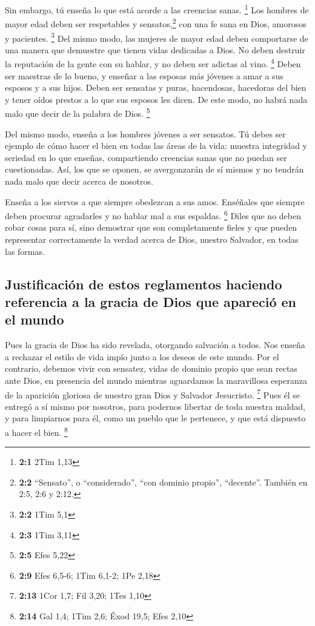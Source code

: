  Sin embargo, tú enseña lo que está acorde a las creencias
sanas. \footnote{\textbf{2:1} 2Tim 1,13}  Los hombres de
mayor edad deben ser respetables y sensatos,\footnote{\textbf{2:2}
  ``Sensato'', o ``considerado'', ``con dominio propio'', ``decente''.
  También en 2:5, 2:6 y 2:12.} con una fe sana en Dios, amorosos y
pacientes. \footnote{\textbf{2:2} 1Tim 5,1}  Del mismo
modo, las mujeres de mayor edad deben comportarse de una manera que
demuestre que tienen vidas dedicadas a Dios. No deben destruir la
reputación de la gente con su hablar, y no deben ser adictas al vino.
\footnote{\textbf{2:3} 1Tim 3,11}  Deben ser maestras de
lo bueno, y enseñar a las esposas más jóvenes a amar a sus esposos y a
sus hijos.  Deben ser sensatas y puras, hacendosas,
hacedoras del bien y tener oídos prestos a lo que sus esposos les dicen.
De este modo, no habrá nada malo que decir de la palabra de Dios.
\footnote{\textbf{2:5} Efes 5,22}

 Del mismo modo, enseña a los hombres jóvenes a ser
sensatos.  Tú debes ser ejemplo de cómo hacer el bien en
todas las áreas de la vida: muestra integridad y seriedad en lo que
enseñas,  compartiendo creencias sanas que no puedan ser
cuestionadas. Así, los que se oponen, se avergonzarán de sí mismos y no
tendrán nada malo que decir acerca de nosotros.

 Enseña a los siervos a que siempre obedezcan a sus amos.
Enséñales que siempre deben procurar agradarles y no hablar mal a sus
espaldas. \footnote{\textbf{2:9} Efes 6,5-6; 1Tim 6,1-2; 1Pe 2,18}
 Diles que no deben robar cosas para sí, sino demostrar
que son completamente fieles y que pueden representar correctamente la
verdad acerca de Dios, nuestro Salvador, en todas las formas.

\hypertarget{justificaciuxf3n-de-estos-reglamentos-haciendo-referencia-a-la-gracia-de-dios-que-apareciuxf3-en-el-mundo}{%
\subsection{Justificación de estos reglamentos haciendo referencia a la
gracia de Dios que apareció en el
mundo}\label{justificaciuxf3n-de-estos-reglamentos-haciendo-referencia-a-la-gracia-de-dios-que-apareciuxf3-en-el-mundo}}

 Pues la gracia de Dios ha sido revelada, otorgando
salvación a todos.  Nos enseña a rechazar el estilo de
vida impío junto a los deseos de este mundo. Por el contrario, debemos
vivir con sensatez, vidas de dominio propio que sean rectas ante Dios,
en presencia del mundo  mientras aguardamos la
maravillosa esperanza de la aparición gloriosa de nuestro gran Dios y
Salvador Jesucristo. \footnote{\textbf{2:13} 1Cor 1,7; Fil 3,20; 1Tes
  1,10}  Pues él se entregó a sí mismo por nosotros, para
podernos libertar de toda nuestra maldad, y para limpiarnos para él,
como un pueblo que le pertenece, y que está dispuesto a hacer el bien.
\footnote{\textbf{2:14} Gal 1,4; 1Tim 2,6; Éxod 19,5; Efes 2,10}

